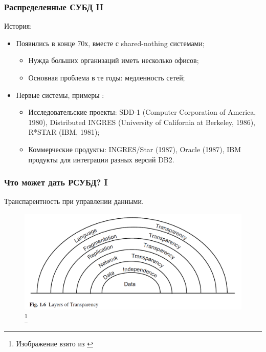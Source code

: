 \documentclass{beamer}
\begin{document}
\begin{frame}
\frametitle{Распределенные СУБД II}

История:

\begin{itemize}
  \setlength\itemsep{1em}
  \item Появились в конце 70х, вместе с shared-nothing системами;
  \begin{itemize}
    \setlength\itemsep{1em}
    \item Нужда больших организаций иметь несколько офисов;
    \item Основная проблема в те годы: медленность сетей;
  \end{itemize}
  \item Первые системы, примеры \cite{Kian-Lee2009}:
\begin{itemize}
  \setlength\itemsep{1em}
  \item Исследовательские проекты: SDD-1 (Computer Corporation of America, 1980), Distributed INGRES (University of California at Berkeley, 1986), R*STAR (IBM, 1981); 
  \item Коммерческие продукты: INGRES/Star (1987), Oracle (1987), IBM продукты для интеграции разных версий DB2.
\end{itemize}


\end{itemize}

\end{frame}


\begin{frame}
\frametitle{Что может дать РСУБД? I}

\alert{Транспарентность при управлении данными.}

\begin{figure}[htb]
\includegraphics[width=\textwidth,height=0.80\textheight,keepaspectratio]{ozsu-2.png} 
\footnote{\tiny{Изображение взято из \cite{Ozsu2011}}}
\end{figure}

\end{frame}
\end{document}

